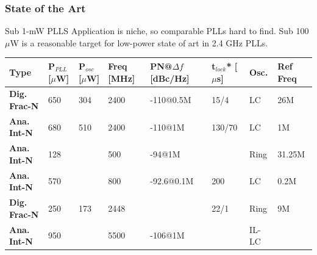 \documentclass[t, screen, aspectratio=43]{beamer}
\begin{document}
\begin{frame}
	\frametitle{State of the Art}
	\begin{block}{Sub 1-mW PLLS}
		\footnotesize Application is niche, so comparable PLLs hard to find. Sub 100$\mu$W is a reasonable target for low-power state of art in 2.4 GHz PLLs.
		\vspace{-1em}
		\begin{table}[htb!]
			\tiny
			\centering
			\def\arraystretch{1.5}		
			\setlength\arrayrulewidth{0.75pt}
			\setlength{\tabcolsep}{1em} %
			\begin{tabular}{|l|l|l|l|l|l|l|l|}
				\hline 
				\rule[-1ex]{0pt}{2.5ex} \cellcolor{gray!40}\textbf{Type} & \cellcolor{gray!40}\textbf{P$_{PLL}$ [$\mu$W]}& \cellcolor{gray!40}\textbf{P$_{osc}$ [$\mu$W] }& \cellcolor{gray!40}\textbf{Freq [MHz]} & \cellcolor{gray!40}\textbf{PN@$\Delta f$ [dBc/Hz]}& \cellcolor{gray!40}\textbf{t$_{lock}$* [$\mu$s]}& \cellcolor{gray!40}\textbf{Osc. }& \cellcolor{gray!40}\textbf{Ref Freq}\\ 
				\hline 
				\rule[-1ex]{0pt}{2.5ex} \textbf{Dig. Frac-N} & 650 & 304 & 2400 & -110@0.5M & 15/4 & LC & 26M\\ 
				\hline 
				\rule[-1ex]{0pt}{2.5ex} \textbf{Ana. Int-N }& 680 & 510 & 2400 & -110@1M & 130/70 & LC & 1M\\ 
				\hline 
				\rule[-1ex]{0pt}{2.5ex} \textbf{Ana. Int-N} & 128 &  & 500 & -94@1M &  & Ring & 31.25M\\ 
				\hline 
				\rule[-1ex]{0pt}{2.5ex} \textbf{Ana. Int-N} & 570 &  & 800 & -92.6@0.1M & 200 & LC & 0.2M\\ 
				\hline 
				\rule[-1ex]{0pt}{2.5ex} \textbf{Dig. Frac-N} & 250 & 173 & 2448 &  & 22/1 & Ring & 9M\\ 
				\hline 
				\rule[-1ex]{0pt}{2.5ex} \textbf{Ana. Int-N} & 950 &  & 5500 & -106@1M &  & IL-LC & \\ 
				\hline 
			\end{tabular} 
		\end{table}  

	\end{block}

\end{frame}
\end{document}
